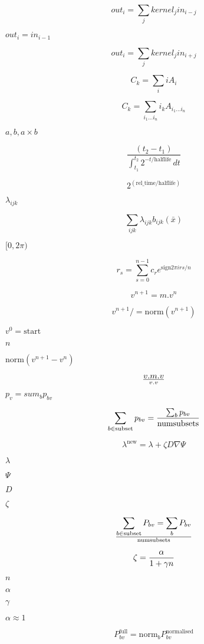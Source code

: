 \documentclass{article}
\begin{document}
\[ out_i = \sum_j kernel_j in_{i-j} \]
\pagebreak

$ out_i = in_{i-1}$
\pagebreak

\[ out_i = \sum_j kernel_j in_{i+j} \]
\pagebreak

\[ C_k = \sum_{i} i A_{i} \]
\pagebreak

\[ C_k = \sum_{i_1...i_n} i_k A_{i_1...i_n} \]
\pagebreak

$ {a, b, a\times b}$
\pagebreak

\[ \frac{(t_2-t_1)}{ \int_{t_1}^{t_2} \! 2^{-t/\mathrm{halflife}} \, dt} \]
\pagebreak

\[ 2^{(\mathrm{rel\_time} / \mathrm{halflife})} \]
\pagebreak

$\lambda_{ijk}$
\pagebreak

\[ \sum_{ijk} \lambda_{ijk} b_{ijk}({\bar x}) \]
\pagebreak

$[0,2\pi)$
\pagebreak

\[ r_s = \sum_{s=0}^{n-1} c_r e^{\mathrm{sign} 2\pi i r s/n} \]
\pagebreak

\[v^{n+1}=m.v^{n}\]
\pagebreak

\[v^{n+1}/=\mathrm{norm}(v^{n+1})\]
\pagebreak

$ v^{0}=\mathrm{start} $
\pagebreak

$ n$
\pagebreak

$ \mathrm{norm}(v^{n+1}-v^{n})$
\pagebreak

\[v.m.v \over v.v \]
\pagebreak

$p_v = sum_b p_{bv}$
\pagebreak

\[\sum_{b \in \rm{subset}} p_{bv} = { \sum_b p_{bv} \over \rm{numsubsets} } \]
\pagebreak

\[ \lambda^\mathrm{new} = \lambda + \zeta D \nabla \Psi \]
\pagebreak

$\lambda$
\pagebreak

$\Psi$
\pagebreak

$D$
\pagebreak

$\zeta$
\pagebreak

\[\sum_{b \in \mathrm{subset}} P_{bv} = \sum_b P_{bv} \over \mathrm{numsubsets} \]
\pagebreak

\[ \zeta= { \alpha \over 1+ \gamma n } \]
\pagebreak

$n$
\pagebreak

$\alpha$
\pagebreak

$\gamma$
\pagebreak

$\alpha \approx 1$
\pagebreak

\[ P^\mathrm{full}_{bv} = \mathrm{norm}_b P^\mathrm{normalised}_{bv} \]
\pagebreak
\end{document}
